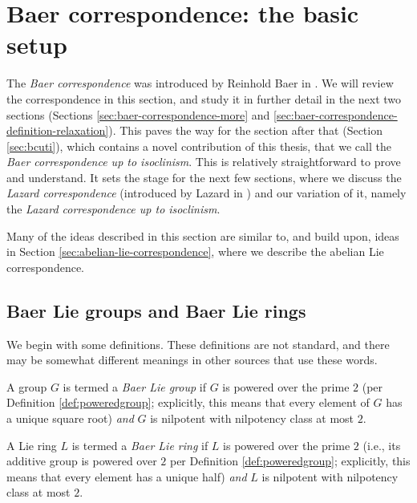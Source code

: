 \section{Baer correspondence: the basic setup}\label{sec:baer-correspondence-basics}

The {\em Baer correspondence} was introduced by Reinhold Baer in
\cite{Baer38}. We will review the correspondence in this section, and
study it in further detail in the next two sections (Sections
\ref{sec:baer-correspondence-more} and
\ref{sec:baer-correspondence-definition-relaxation}). This paves the
  way for the section after that (Section \ref{sec:bcuti}), which
  contains a novel contribution of this thesis, that we call the {\em
    Baer correspondence up to isoclinism}. This is relatively
  straightforward to prove and understand. It sets the stage for the
  next few sections, where we discuss the {\em Lazard correspondence}
  (introduced by Lazard in \cite{Lazardsoriginal}) and our variation
  of it, namely the {\em Lazard correspondence up to isoclinism}.

Many of the ideas described in this section are similar to, and build
upon, ideas in Section \ref{sec:abelian-lie-correspondence}, where we
describe the abelian Lie correspondence.

\subsection{Baer Lie groups and Baer Lie rings}\label{sec:baer-lie-definitions}

We begin with some definitions. These definitions are not standard,
and there may be somewhat different meanings in other sources that use
these words.

\begin{definer}\label{def:baer-lie-group}
  A group $G$ is termed a {\em Baer Lie group} if $G$ is powered over
  the prime $2$ (per Definition \ref{def:poweredgroup}; explicitly,
  this means that every element of $G$ has a unique square root) {\em
    and} $G$ is nilpotent with nilpotency class at most $2$.
\end{definer}

\begin{definer}\label{def:baer-lie-ring}
  A Lie ring $L$ is termed a {\em Baer Lie ring} if $L$ is powered
  over the prime $2$ (i.e., its additive group is powered over $2$ per
  Definition \ref{def:poweredgroup}; explicitly, this means that every
  element has a unique half) {\em and} $L$ is nilpotent with
  nilpotency class at most $2$.
\end{definer}

